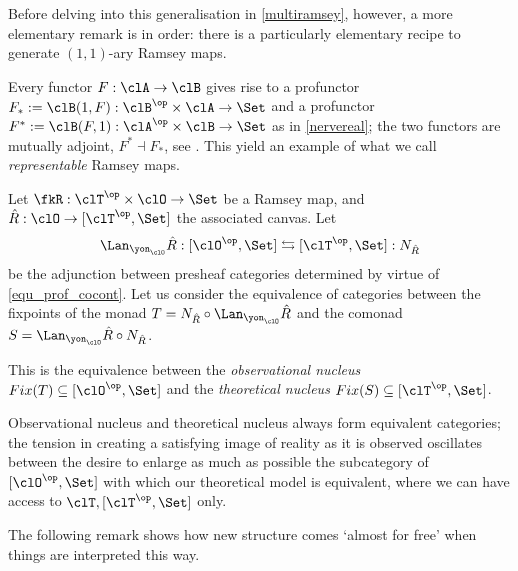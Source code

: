 Before delving into this generalisation in \autoref{multiramsey}, however, a more elementary remark is in order: there is a particularly elementary recipe to generate $(1,1)$-ary Ramsey maps.
\begin{example}
	Every functor $F : \clA \to \clB$ gives rise to a profunctor $F_* := \clB(1,F) : \clB^\op\times \clA\to\Set$ and a profunctor $F^* := \clB(F,1) : \clA^\op\times\clB \to \Set$ as in \autoref{nervereal}; the two functors are mutually adjoint, $F^*\dashv F_*$, see \cite[6.2]{Bor2}. This yield an example of what we call \emph{representable} Ramsey maps.
\end{example}
\begin{definition}\label{nuclei}
	Let $\fkR : \clT^\op\times \clO \to\Set$ be a Ramsey map, and $\hat R : \clO \to [\clT^\op,\Set]$ the associated canvas. Let
	\[ \label{lalan} \Lan_{\yon_\clO}\hat R : [\clO^\op,\Set] \leftrightarrows [\clT^\op,\Set] : N_{\hat R} \]
	be the adjunction between presheaf categories determined by virtue of \autoref{equ_prof_cocont}. Let us consider the equivalence of categories between the fixpoints of the monad $T = N_{\hat R}\circ\Lan_{\yon_\clO}\hat R$ and the comonad $S=\Lan_{\yon_\clO}\hat R\circ N_{\hat R}$.
	
	This is the equivalence between the \emph{observational nucleus} $Fix(T)\subseteq [\clO^\op,\Set]$ and the \emph{theoretical nucleus} $Fix(S)\subseteq [\clT^\op,\Set]$.
\end{definition}
\begin{remark}
	Observational nucleus and theoretical nucleus always form equivalent categories; the tension in creating a satisfying image of reality as it is observed oscillates between the desire to enlarge as much as possible the subcategory of $[\clO^\op,\Set]$ with which our theoretical model is equivalent, where we can have access to $\clT, [\clT^\op, \Set]$ only.
\end{remark}
The following remark shows how new structure comes `almost for free' when things are interpreted this way. 

